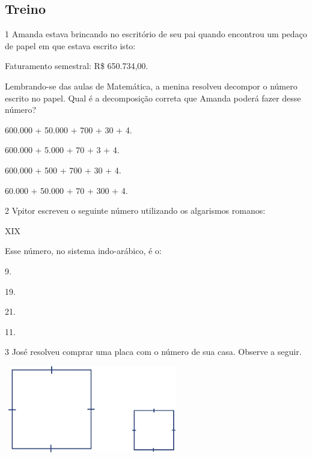 
\subsection{Treino}

\num{1} Amanda estava brincando no escritório de seu pai quando encontrou um
pedaço de papel em que estava escrito isto:

\begin{mdframed}[linewidth=2pt,linecolor=azul!20,backgroundcolor=azul!20,roundcorner=2pt]
Faturamento semestral: R\$ 650.734,00.
\end{mdframed}

Lembrando-se das aulas de Matemática, a menina resolveu decompor o número escrito
no papel. Qual é a decomposição correta que Amanda poderá fazer desse
número?

\begin{escolha}
\item
  600.000 + 50.000 + 700 + 30 + 4.
\item
  600.000 + 5.000 + 70 + 3 + 4.
\item
  600.000 + 500 + 700 + 30 + 4.
\item
  60.000 + 50.000 + 70 + 300 + 4.
\end{escolha}

\num{2} Vpitor escreveu o seguinte número utilizando os algarismos romanos:

\begin{center}
\begin{mdframed}[linewidth=2pt,linecolor=azul!20,backgroundcolor=azul!20,roundcorner=2pt]
XIX
\end{mdframed}
\end{center}

Esse número, no sistema indo-arábico, é o:

\begin{escolha}
\item
  9.
\item
  19.
\item
  21.
\item
  11.
\end{escolha}


\num{3} José resolveu comprar uma placa com o número de sua casa. Observe a seguir.

\includegraphics[width=3.02500in,height=1.48973in]{media/image26.png}

